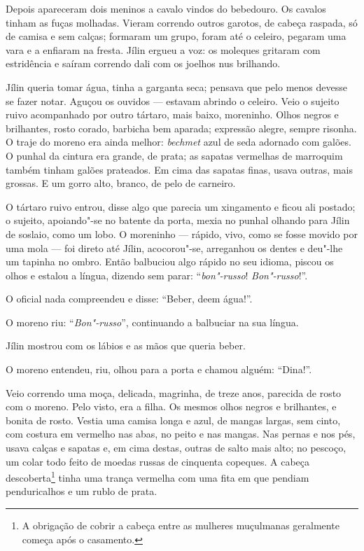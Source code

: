 Depois apareceram dois meninos a cavalo vindos do bebedouro. Os cavalos
tinham as fuças molhadas. Vieram correndo outros garotos, de cabeça
raspada, só de camisa e sem calças; formaram um grupo, foram até o
celeiro, pegaram uma vara e a enfiaram na fresta. Jílin ergueu a voz: os
moleques gritaram com estridência e saíram correndo dali com os joelhos
nus brilhando.

Jílin queria tomar água, tinha a garganta seca; pensava que pelo menos
devesse se fazer notar. Aguçou os ouvidos --- estavam abrindo o celeiro.
Veio o sujeito ruivo acompanhado por outro tártaro, mais baixo,
moreninho. Olhos negros e brilhantes, rosto corado, barbicha bem
aparada; expressão alegre, sempre risonha. O traje do moreno era ainda
melhor: \emph{bechmet} azul de seda adornado com galões. O punhal da
cintura era grande, de prata; as sapatas vermelhas de marroquim também
tinham galões prateados. Em cima das sapatas finas, usava outras,
mais grossas. E um gorro alto, branco, de pelo de carneiro.

O tártaro ruivo entrou, disse algo que parecia um xingamento e ficou ali
postado; o sujeito, apoiando"-se no batente da porta, mexia no punhal
olhando para Jílin de soslaio, como um lobo. O moreninho --- rápido,
vivo, como se fosse movido por uma mola --- foi direto até Jílin,
acocorou"-se, arreganhou os dentes e deu"-lhe um tapinha no ombro. Então
balbuciou algo rápido no seu idioma, piscou os olhos e estalou a língua,
dizendo sem parar: ``\emph{bon"-russo}! \emph{Bon"-russo}!''.

O oficial nada compreendeu e disse: ``Beber, deem água!''.

O moreno riu: ``\emph{Bon"-russo}'', continuando a balbuciar na sua
língua.

Jílin mostrou com os lábios e as mãos que queria beber.

O moreno entendeu, riu, olhou para a porta e chamou alguém: ``Dina!''.

Veio correndo uma moça, delicada, magrinha, de treze anos, parecida de
rosto com o moreno. Pelo visto, era a filha. Os mesmos olhos negros e
brilhantes, e bonita de rosto. Vestia uma camisa longa e azul, de mangas
largas, sem cinto, com costura em vermelho nas abas, no peito e nas
mangas. Nas pernas e nos pés, usava calças e sapatas e, em cima destas,
outras de salto mais alto; no pescoço, um colar todo feito de
moedas russas de cinquenta copeques. A cabeça descoberta\footnote{A
  obrigação de cobrir a cabeça entre as mulheres muçulmanas geralmente
  começa após o casamento.} tinha uma trança vermelha com uma fita em
que pendiam penduricalhos e um rublo de prata.

